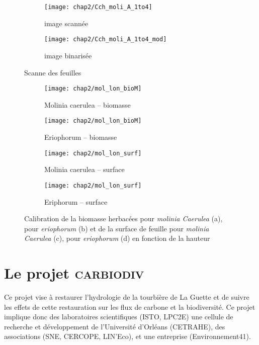 \begin{figure}
	\centering
	\begin{subfigure}[t]{0.5\textwidth}
		\centering
		\texttt{[image: chap2/Cch\_moli\_A\_1to4]}
		\caption{image scannée}
	\end{subfigure}%
	\begin{subfigure}[t]{0.5\textwidth}
		\centering
		\texttt{[image: chap2/Cch\_moli\_A\_1to4\_mod]}
		\caption{image binarisée}
	\end{subfigure}
\caption{Scanne des feuilles}
\label{fig:scan_mol}
\end{figure}


\begin{figure}
	\centering
	\begin{subfigure}[t]{0.5\textwidth}
		\centering
		\texttt{[image: chap2/mol\_lon\_bioM]}
		\caption{Molinia caerulea -- biomasse}
	\end{subfigure}%
	\begin{subfigure}[t]{0.5\textwidth}
		\centering
		\texttt{[image: chap2/mol\_lon\_bioM]}
		\caption{Eriophorum -- biomasse}
	\end{subfigure}
	
	
	\begin{subfigure}[t]{0.5\textwidth}
		\centering
		\texttt{[image: chap2/mol\_lon\_surf]}
		\caption{Molinia caerulea -- surface}
	\end{subfigure}%
	\begin{subfigure}[t]{0.5\textwidth}
		\centering
		\texttt{[image: chap2/mol\_lon\_surf]}
		\caption{Eriphorum -- surface}
	\end{subfigure}
\caption{Calibration de la biomasse herbacées pour \textit{molinia Caerulea} (a), pour \textit{eriophorum} (b) et de la surface de feuille pour \textit{molinia Caerulea} (c), pour \textit{eriophorum} (d) en fonction de la hauteur}
\label{fig:cal_herb}
\end{figure}


\section{Le projet \textsc{carbiodiv}}
\label{sec:carbiodiv}

Ce projet vise à restaurer l'hydrologie de la tourbière de La Guette et de suivre les effets de cette restauration sur les flux de carbone et la biodiversité.
Ce projet implique donc des laboratoires scientifiques (ISTO, LPC2E) une cellule de recherche et développement de l'Université d'Orléans (CETRAHE), des associations (SNE, CERCOPE, LIN'Eco), et une entreprise (Environnement41).



